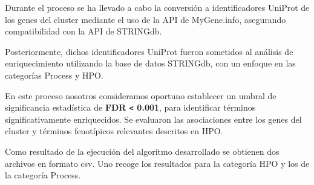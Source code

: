 Durante el proceso se ha llevado a cabo la conversión a identificadores UniProt de los genes del cluster mediante el uso de la API de MyGene.info, asegurando compatibilidad con la API de STRINGdb.

Posteriormente, dichos identificadores UniProt fueron sometidos al análisis de enriquecimiento utilizando la base de datos STRINGdb, con un enfoque en las categorías Process y HPO. 

En este proceso nosotros consideramos oportuno establecer un umbral de significancia estadística de \textbf{ FDR  \texttt< 0.001}, para identificar términos significativamente enriquecidos.
Se evaluaron las asociaciones entre los genes del cluster y términos fenotípicos relevantes descritos en HPO.

Como resultado de la ejecución del algoritmo desarrollado se obtienen dos archivos en formato csv. Uno recoge los resultados para la categoría HPO y los de la categoría Process.

